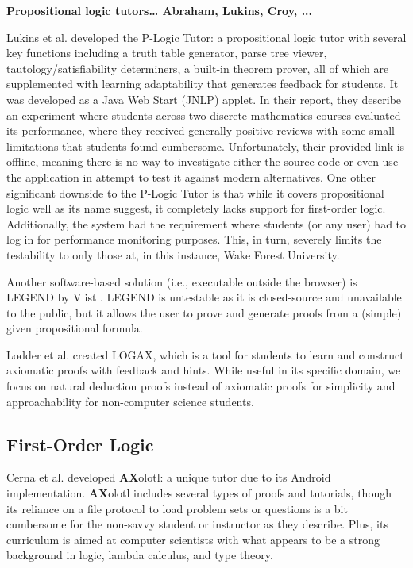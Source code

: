 \documentclass[ms]{uncgdissertationexp2}
\theoremstyle{plain}
\theoremstyle{definition}
\theoremstyle{remark}
\begin{document}
\textbf{Propositional logic tutors… Abraham, Lukins, Croy, ...}

Lukins et al. \cite{lukins} developed the P-Logic Tutor: a propositional logic tutor with several key functions including a truth table generator, parse tree viewer, tautology/satisfiability determiners, a built-in theorem prover, all of which are supplemented with learning adaptability that generates feedback for students. It was developed as a Java Web Start (JNLP) applet. In their report, they describe an experiment where students across two discrete mathematics courses evaluated its performance, where they received generally positive reviews with some small limitations that students found cumbersome. Unfortunately, their provided link is offline, meaning there is no way to investigate either the source code or even use the application in attempt to test it against modern alternatives. One other significant downside to the P-Logic Tutor is that while it covers propositional logic well as its name suggest, it completely lacks support for first-order logic. Additionally, the system had the requirement where students (or any user) had to log in for performance monitoring purposes. This, in turn, severely limits the testability to only those at, in this instance, Wake Forest University. 

Another software-based solution (i.e., executable outside the browser) is LEGEND by Vlist \cite{vlist}. LEGEND is untestable as it is closed-source and unavailable to the public, but it allows the user to prove and generate proofs from a (simple) given propositional formula.

Lodder et al. \cite{lodder} created LOGAX, which is a tool for students to learn and construct axiomatic proofs with feedback and hints. While useful in its specific domain, we focus on natural deduction proofs instead of axiomatic proofs for simplicity and approachability for non-computer science students.

\subsection{First-Order Logic}
Cerna et al. \cite{cerna} developed \textbf{AX}olotl: a unique tutor due to its Android implementation. \textbf{AX}olotl includes several types of proofs and tutorials, though its reliance on a file protocol to load problem sets or questions is a bit cumbersome for the non-savvy student or instructor as they describe. Plus, its curriculum is aimed at computer scientists with what appears to be a strong background in logic, lambda calculus, and type theory.
\end{document}
